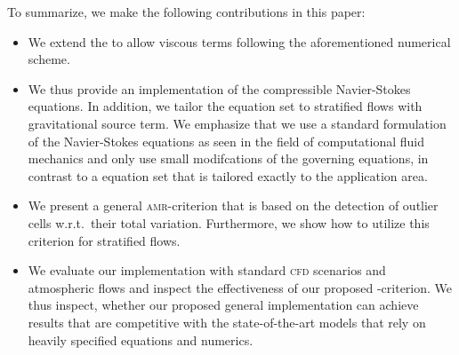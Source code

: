 \documentclass[runningheads]{llncs}
\begin{document}
To summarize, we make the following contributions in this paper:%
\begin{itemize}%
\item We extend the \exahypeengine{} to allow viscous terms following the aforementioned numerical scheme.
\item We thus provide an implementation of the compressible Navier-Stokes equations.
  In addition, we tailor the equation set to stratified flows with gravitational source term.
  We emphasize that we use a standard formulation of the Navier-Stokes equations as seen in the field of computational fluid mechanics and only use small modifcations of the governing equations, in contrast to a equation set that is tailored exactly to the application area.
\item We present a general \textsc{amr}-criterion that is based on the detection of outlier cells w.r.t.\ their total variation.
  Furthermore, we show how to utilize this criterion for stratified flows.
\item We evaluate our implementation with standard \textsc{cfd} scenarios and atmospheric flows and inspect the effectiveness of our proposed \amr{}-criterion.
  We thus inspect, whether our proposed general implementation can achieve results that are competitive with the state-of-the-art models that rely on heavily specified equations and numerics.
\end{itemize}
%
\end{document}
